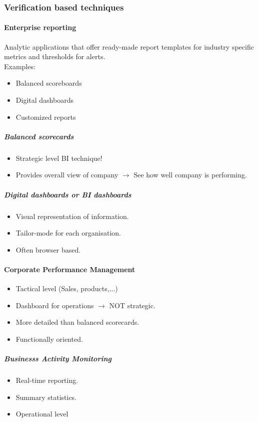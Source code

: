 \documentclass[a4paper,twoside,10pt]{report}
\begin{document}
\subsubsection{Verification based techniques}
\paragraph{Enterprise reporting} Analytic applications that offer ready-made report templates for industry specific metrics and thresholds for alerts. \\ 
Examples:
\begin{itemize}
	\item Balanced scoreboards
	\item Digital dashboards
	\item Customized reports
\end{itemize}
\subparagraph{Balanced scorecards} 
\begin{itemize}
	\item Strategic level BI technique!
	\item Provides overall view of company $\rightarrow$ See how well company is performing.
\end{itemize}
\subparagraph{Digital dashboards or BI dashboards} 
\begin{itemize}
	\item Visual representation of information.
	\item Tailor-mode for each organisation.
	\item Often browser based.
\end{itemize}

\paragraph{Corporate Performance Management}
\begin{itemize}
	\item Tactical level (Sales, products,...)
	\item Dashboard for operations $\rightarrow$ NOT strategic.
	\item More detailed than balanced scorecards.
	\item Functionally oriented.
\end{itemize}
\subparagraph{Businesss Activity Monitoring}
\begin{itemize}
	\item Real-time reporting.
	\item Summary statistics.
	\item Operational level
\end{itemize}
\end{document}
